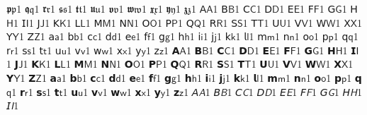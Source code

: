 {𝖕}{{\(\bm{{\mathfrak{p}}}\)}}1 {𝖖}{{\(\bm{{\mathfrak{q}}}\)}}1 {𝖗}{{\(\bm{{\mathfrak{r}}}\)}}1 {𝖘}{{\(\bm{{\mathfrak{s}}}\)}}1 {𝖙}{{\(\bm{{\mathfrak{t}}}\)}}1 {𝖚}{{\(\bm{{\mathfrak{u}}}\)}}1 {𝖛}{{\(\bm{{\mathfrak{v}}}\)}}1 {𝖜}{{\(\bm{{\mathfrak{w}}}\)}}1 {𝖝}{{\(\bm{{\mathfrak{x}}}\)}}1 {𝖞}{{\(\bm{{\mathfrak{y}}}\)}}1 {𝖟}{{\(\bm{{\mathfrak{z}}}\)}}1 {𝖠}{{\(\mathsf{A}\)}}1 {𝖡}{{\(\mathsf{B}\)}}1 {𝖢}{{\(\mathsf{C}\)}}1 {𝖣}{{\(\mathsf{D}\)}}1 {𝖤}{{\(\mathsf{E}\)}}1 {𝖥}{{\(\mathsf{F}\)}}1 {𝖦}{{\(\mathsf{G}\)}}1 {𝖧}{{\(\mathsf{H}\)}}1 {𝖨}{{\(\mathsf{I}\)}}1 {𝖩}{{\(\mathsf{J}\)}}1 {𝖪}{{\(\mathsf{K}\)}}1 {𝖫}{{\(\mathsf{L}\)}}1 {𝖬}{{\(\mathsf{M}\)}}1 {𝖭}{{\(\mathsf{N}\)}}1 {𝖮}{{\(\mathsf{O}\)}}1 {𝖯}{{\(\mathsf{P}\)}}1 {𝖰}{{\(\mathsf{Q}\)}}1 {𝖱}{{\(\mathsf{R}\)}}1 {𝖲}{{\(\mathsf{S}\)}}1 {𝖳}{{\(\mathsf{T}\)}}1 {𝖴}{{\(\mathsf{U}\)}}1 {𝖵}{{\(\mathsf{V}\)}}1 {𝖶}{{\(\mathsf{W}\)}}1 {𝖷}{{\(\mathsf{X}\)}}1 {𝖸}{{\(\mathsf{Y}\)}}1 {𝖹}{{\(\mathsf{Z}\)}}1 {𝖺}{{\(\mathsf{a}\)}}1 {𝖻}{{\(\mathsf{b}\)}}1 {𝖼}{{\(\mathsf{c}\)}}1 {𝖽}{{\(\mathsf{d}\)}}1 {𝖾}{{\(\mathsf{e}\)}}1 {𝖿}{{\(\mathsf{f}\)}}1 {𝗀}{{\(\mathsf{g}\)}}1 {𝗁}{{\(\mathsf{h}\)}}1 {𝗂}{{\(\mathsf{i}\)}}1 {𝗃}{{\(\mathsf{j}\)}}1 {𝗄}{{\(\mathsf{k}\)}}1 {𝗅}{{\(\mathsf{l}\)}}1 {𝗆}{{\(\mathsf{m}\)}}1 {𝗇}{{\(\mathsf{n}\)}}1 {𝗈}{{\(\mathsf{o}\)}}1 {𝗉}{{\(\mathsf{p}\)}}1 {𝗊}{{\(\mathsf{q}\)}}1 {𝗋}{{\(\mathsf{r}\)}}1 {𝗌}{{\(\mathsf{s}\)}}1 {𝗍}{{\(\mathsf{t}\)}}1 {𝗎}{{\(\mathsf{u}\)}}1 {𝗏}{{\(\mathsf{v}\)}}1 {𝗐}{{\(\mathsf{w}\)}}1 {𝗑}{{\(\mathsf{x}\)}}1 {𝗒}{{\(\mathsf{y}\)}}1 {𝗓}{{\(\mathsf{z}\)}}1 {𝗔}{{\(\bm{{\mathsf{A}}}\)}}1 {𝗕}{{\(\bm{{\mathsf{B}}}\)}}1 {𝗖}{{\(\bm{{\mathsf{C}}}\)}}1 {𝗗}{{\(\bm{{\mathsf{D}}}\)}}1 {𝗘}{{\(\bm{{\mathsf{E}}}\)}}1 {𝗙}{{\(\bm{{\mathsf{F}}}\)}}1 {𝗚}{{\(\bm{{\mathsf{G}}}\)}}1 {𝗛}{{\(\bm{{\mathsf{H}}}\)}}1 {𝗜}{{\(\bm{{\mathsf{I}}}\)}}1 {𝗝}{{\(\bm{{\mathsf{J}}}\)}}1 {𝗞}{{\(\bm{{\mathsf{K}}}\)}}1 {𝗟}{{\(\bm{{\mathsf{L}}}\)}}1 {𝗠}{{\(\bm{{\mathsf{M}}}\)}}1 {𝗡}{{\(\bm{{\mathsf{N}}}\)}}1 {𝗢}{{\(\bm{{\mathsf{O}}}\)}}1 {𝗣}{{\(\bm{{\mathsf{P}}}\)}}1 {𝗤}{{\(\bm{{\mathsf{Q}}}\)}}1 {𝗥}{{\(\bm{{\mathsf{R}}}\)}}1 {𝗦}{{\(\bm{{\mathsf{S}}}\)}}1 {𝗧}{{\(\bm{{\mathsf{T}}}\)}}1 {𝗨}{{\(\bm{{\mathsf{U}}}\)}}1 {𝗩}{{\(\bm{{\mathsf{V}}}\)}}1 {𝗪}{{\(\bm{{\mathsf{W}}}\)}}1 {𝗫}{{\(\bm{{\mathsf{X}}}\)}}1 {𝗬}{{\(\bm{{\mathsf{Y}}}\)}}1 {𝗭}{{\(\bm{{\mathsf{Z}}}\)}}1 {𝗮}{{\(\bm{{\mathsf{a}}}\)}}1 {𝗯}{{\(\bm{{\mathsf{b}}}\)}}1 {𝗰}{{\(\bm{{\mathsf{c}}}\)}}1 {𝗱}{{\(\bm{{\mathsf{d}}}\)}}1 {𝗲}{{\(\bm{{\mathsf{e}}}\)}}1 {𝗳}{{\(\bm{{\mathsf{f}}}\)}}1 {𝗴}{{\(\bm{{\mathsf{g}}}\)}}1 {𝗵}{{\(\bm{{\mathsf{h}}}\)}}1 {𝗶}{{\(\bm{{\mathsf{i}}}\)}}1 {𝗷}{{\(\bm{{\mathsf{j}}}\)}}1 {𝗸}{{\(\bm{{\mathsf{k}}}\)}}1 {𝗹}{{\(\bm{{\mathsf{l}}}\)}}1 {𝗺}{{\(\bm{{\mathsf{m}}}\)}}1 {𝗻}{{\(\bm{{\mathsf{n}}}\)}}1 {𝗼}{{\(\bm{{\mathsf{o}}}\)}}1 {𝗽}{{\(\bm{{\mathsf{p}}}\)}}1 {𝗾}{{\(\bm{{\mathsf{q}}}\)}}1 {𝗿}{{\(\bm{{\mathsf{r}}}\)}}1 {𝘀}{{\(\bm{{\mathsf{s}}}\)}}1 {𝘁}{{\(\bm{{\mathsf{t}}}\)}}1 {𝘂}{{\(\bm{{\mathsf{u}}}\)}}1 {𝘃}{{\(\bm{{\mathsf{v}}}\)}}1 {𝘄}{{\(\bm{{\mathsf{w}}}\)}}1 {𝘅}{{\(\bm{{\mathsf{x}}}\)}}1 {𝘆}{{\(\bm{{\mathsf{y}}}\)}}1 {𝘇}{{\(\bm{{\mathsf{z}}}\)}}1 {𝘈}{{\(\mathsfit{A}\)}}1 {𝘉}{{\(\mathsfit{B}\)}}1 {𝘊}{{\(\mathsfit{C}\)}}1 {𝘋}{{\(\mathsfit{D}\)}}1 {𝘌}{{\(\mathsfit{E}\)}}1 {𝘍}{{\(\mathsfit{F}\)}}1 {𝘎}{{\(\mathsfit{G}\)}}1 {𝘏}{{\(\mathsfit{H}\)}}1 {𝘐}{{\(\mathsfit{I}\)}}1 